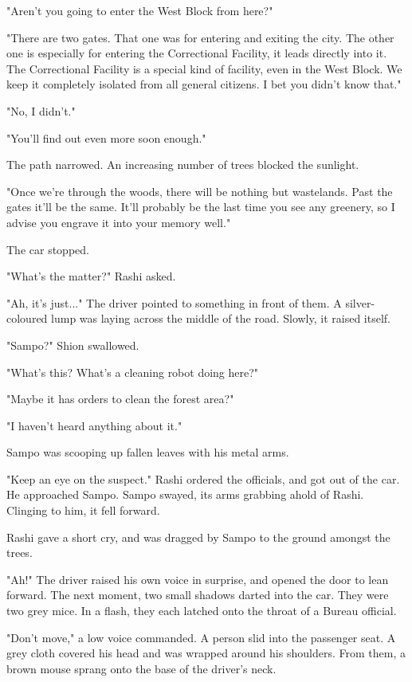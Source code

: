"Aren't you going to enter the West Block from here?"

"There are two gates. That one was for entering and exiting the city.
The other one is especially for entering the Correctional Facility, it
leads directly into it. The Correctional Facility is a special kind of
facility, even in the West Block. We keep it completely isolated from
all general citizens. I bet you didn't know that."

"No, I didn't."

"You'll find out even more soon enough."

The path narrowed. An increasing number of trees blocked the sunlight.

"Once we're through the woods, there will be nothing but wastelands.
Past the gates it'll be the same. It'll probably be the last time you
see any greenery, so I advise you engrave it into your memory well."

The car stopped.

"What's the matter?" Rashi asked.

"Ah, it's just..." The driver pointed to something in front of them. A
silver-coloured lump was laying across the middle of the road. Slowly,
it raised itself.

"Sampo?" Shion swallowed.

"What's this? What's a cleaning robot doing here?"

"Maybe it has orders to clean the forest area?"

"I haven't heard anything about it."

Sampo was scooping up fallen leaves with his metal arms.

"Keep an eye on the suspect." Rashi ordered the officials, and got out
of the car. He approached Sampo. Sampo swayed, its arms grabbing ahold
of Rashi. Clinging to him, it fell forward.

Rashi gave a short cry, and was dragged by Sampo to the ground amongst
the trees.

"Ah!" The driver raised his own voice in surprise, and opened the door
to lean forward. The next moment, two small shadows darted into the car.
They were two grey mice. In a flash, they each latched onto the throat
of a Bureau official.

"Don't move," a low voice commanded. A person slid into the passenger
seat. A grey cloth covered his head and was wrapped around his
shoulders. From them, a brown mouse sprang onto the base of the driver's
neck.

